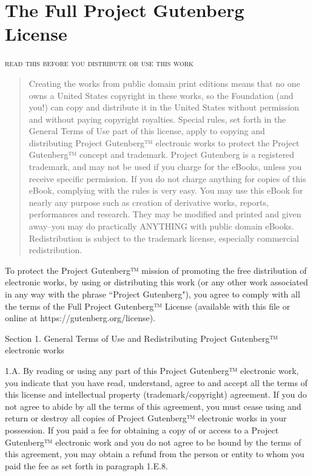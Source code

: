\clearpage
\pagestyle{empty}

\chapter*{The Full Project Gutenberg License}
{\smaller

\begin{center}
\textsc{\MakeLowercase{READ THIS BEFORE YOU DISTRIBUTE OR USE THIS WORK}}
\end{center}

\begin{quote}
\smaller
Creating the works from public domain print editions means that no
one owns a United States copyright in these works, so the Foundation
(and you!) can copy and distribute it in the United States without
permission and without paying copyright royalties. Special rules,
set forth in the General Terms of Use part of this license, apply to
copying and distributing Project Gutenberg™ electronic works to
protect the Project Gutenberg™ concept and trademark. Project
Gutenberg is a registered trademark, and may not be used if you
charge for the eBooks, unless you receive specific permission. If you
do not charge anything for copies of this eBook, complying with the
rules is very easy. You may use this eBook for nearly any purpose
such as creation of derivative works, reports, performances and
research. They may be modified and printed and given away--you may do
practically ANYTHING with public domain eBooks. Redistribution is
subject to the trademark license, especially commercial
redistribution.
\end{quote}

To protect the Project Gutenberg™ mission of promoting the free
distribution of electronic works, by using or distributing this work
(or any other work associated in any way with the phrase “Project
Gutenberg"), you agree to comply with all the terms of the Full Project
Gutenberg™ License (available with this file or online at
https://gutenberg.org/license).

\setlength{\parskip}{0.5em}
\setlength{\parindent}{0em}

\newpage
\begin{center}
Section 1. General Terms of Use and Redistributing Project Gutenberg™
electronic works
\end{center}

1.A. By reading or using any part of this Project Gutenberg™
electronic work, you indicate that you have read, understand, agree to
and accept all the terms of this license and intellectual property
(trademark/copyright) agreement. If you do not agree to abide by all
the terms of this agreement, you must cease using and return or destroy
all copies of Project Gutenberg™ electronic works in your possession.
If you paid a fee for obtaining a copy of or access to a Project
Gutenberg™ electronic work and you do not agree to be bound by the
terms of this agreement, you may obtain a refund from the person or
entity to whom you paid the fee as set forth in paragraph 1.E.8.

}
